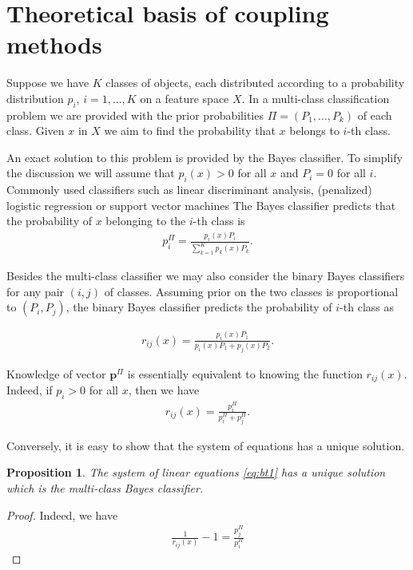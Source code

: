 \documentclass[twoside,11pt]{article}
\newtheorem{prop}{Proposition}
\begin{document}
\section{Theoretical basis of coupling methods}

Suppose we have $K$ classes of objects, each distributed according to a probability distribution $p_i$, $i=1,\ldots, K$ on a feature space $X$. In a multi-class classification problem we are provided with the prior probabilities $\Pi = (P_1, \ldots, P_k)$ of each class. Given $x$ in $X$ we aim to find the probability that $x$ belongs to $i$-th class. 

An exact solution to this problem is provided by the Bayes classifier. To simplify the discussion we will assume that $p_i(x) > 0$ for all $x$ and $P_i = 0$ for all $i$. Commonly used classifiers such as linear discriminant analysis, (penalized) logistic regression or support vector machines The Bayes classifier predicts that the probability of $x$ belonging to the $i$-th class is
\begin{align}
 p^\Pi_i = \frac{p_i(x) P_i}{\sum_{k=1}^K p_k(x)P_k}.
\end{align}

Besides the multi-class classifier we may also consider the binary Bayes classifiers for any pair $(i,j)$ of classes. Assuming prior on the two classes is proportional to $(P_i, P_j)$, the binary Bayes classifier predicts the probability of $i$-th class as 

\begin{align}
	r_{ij}(x) = \frac{p_i(x) P_1}{p_i(x)P_1 + p_j(x)P_2}.
\end{align}

Knowledge of vector $\boldsymbol{p}^\Pi$ is essentially equivalent to knowing the function $r_{ij}(x)$. Indeed, if $p_{i}> 0$ for all $x$, then we have
\begin{align}
r_{ij}(x) = \frac{p_i^\Pi}{p_i^\Pi + p_j^\Pi}. \label{eq:bt1}
\end{align}

Conversely, it is easy to show that  the system of equations \label{eq:bt1} has a unique solution.

\begin{prop} \label{prop:binary2multi}
The system of linear equations \eqref{eq:bt1}  has a unique solution which is the multi-class Bayes classifier.
\end{prop}
\begin{proof}
Indeed, we have 
\begin{align*}
\frac{1}{r_{ij}(x)} - 1 = \frac{p_j^\Pi}{p_i^\Pi}
\end{align*}
\end{proof}
\end{document}
